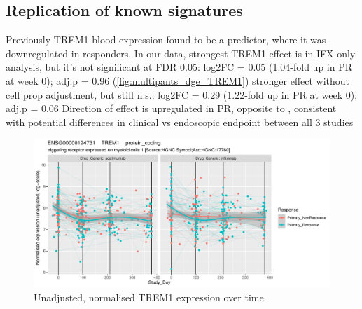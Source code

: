 \begin{outline}
\subsection{Replication of known signatures}



\1 Previously TREM1 blood expression found to be a predictor, where it was downregulated in responders.
    \2 In our data, strongest TREM1 effect is in IFX only analysis, but it’s not significant at FDR 0.05: log2FC = 0.05 (1.04-fold up in PR at week 0); adj.p = 0.96 (\autoref{fig:multipants_dge_TREM1})
        \3 stronger effect without cell prop adjustment, but still n.s.: log2FC = 0.29 (1.22-fold up in PR at week 0); adj.p = 0.06
    \2 Direction of effect is upregulated in PR, opposite to \autocite{verstockt2019LowTREM1Expression}, consistent with \autocite{gaujoux2019CellcentredMetaanalysisReveals}
    \2 potential differences in clinical vs endoscopic endpoint between all 3 studies



\begin{figure}
    \centering
    \includegraphics[width=1.0\textwidth,page=1]{mainmatter/figures/chapter_04/dream.E_vs_Study_Day.GENEID_ENSG00000124731.SYMBOL_TREM1.pdf}
    \caption{Unadjusted, normalised TREM1 expression over time}
    \label{fig:multipants_dge_TREM1}
\end{figure}


\end{outline}
